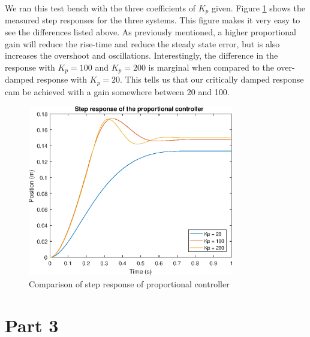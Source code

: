 \documentclass{article}
\begin{document}
We ran this test bench with the three coefficients of $K_p$ given. Figure \ref{fig:resp2} shows the measured step responses for the three systems. This figure makes it very easy to see the differences listed above. As previously mentioned, a higher proportional gain will reduce the rise-time and reduce the steady state error, but is also increases the overshoot and oscillations. Interestingly, the difference in the response with $K_p = 100$ and $K_p = 200$ is marginal when compared to the over-damped response with $K_p = 20$. This tells us that our critically damped response cam be achieved with a gain somewhere between 20 and 100.

\begin{figure}[!htb]
    \centering
    \includegraphics[width=0.8\textwidth]{../Experiments/part2_response.eps}
    \caption{Comparison of step response of proportional controller}
    \label{fig:resp2}
\end{figure}

\section*{Part 3}
\end{document}
